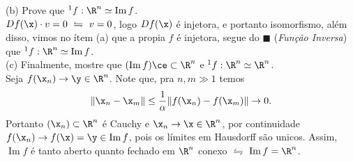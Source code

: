 (b) Prove que \(^1 f: \R^n \simeq \operatorname{Im}f\). \\ 
\textcolor{gris}{\(Df(\x) \cdot v = 0 \ \leftrightharpoons \ v=0\), logo \(Df(\x)\) é injetora, e portanto isomorfismo, além disso, vimos no ítem (a) que a propia \(f\) é injetora, segue do \(\blacksquare\) (\emph{Função Inversa}) que \(^1f:\R^n\simeq \operatorname{Im}f\).  }\vspace{0.3cm}\\ 
(c) Finalmente, mostre que \((\operatorname{Im}f)\ce \subset \R^n\) e \(^1f:\R^n \simeq \R^n\). \vspace{0.3cm}\\ 
\textcolor{gris}{Seja \(f(\x_n) \to \y \in \R^n\). Note que, pra \(n, m \gg 1\) temos 
\[\|\x_n - \x_m\| \leq \frac{1}{\alpha}\|f(\x_n) - f(\x_m)\| \to 0.\] 
Portanto \((\x_n) \subset \R^n\) é Cauchy e \(\x_n \to \x \in \R^n\), por continuidade \(f(\x_n) \to f(\x) =\y \in \operatorname{Im}f\), pois os límites em Hausdorff são unicos. Assim, \(\operatorname{Im}f\) é tanto aberto quanto fechado em \(\R^n\) conexo \(\leftrightharpoons\) \(\operatorname{Im}f = \R^n\). 
}


